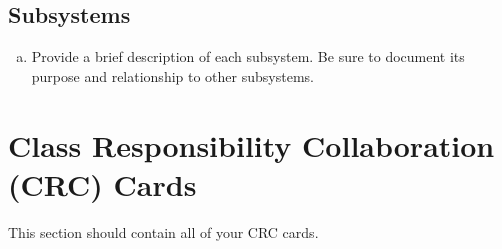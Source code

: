 \documentclass[]{article}
\begin{document}

\subsection{Subsystems}
\label{sub:subsystems}
\begin{enumerate}[a)]
	\item Provide a brief description of each subsystem. Be sure to document its
purpose and relationship to other subsystems.
\end{enumerate}


\section{Class Responsibility Collaboration (CRC) Cards}
\label{sec:class_responsibility_collaboration_crc_cards}
This section should contain all of your CRC cards.
\end{document}
